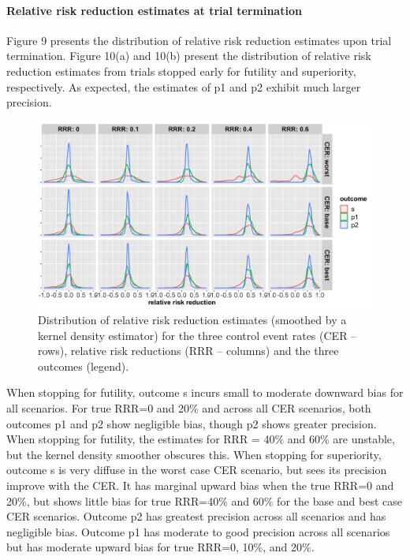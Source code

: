 \documentclass[]{article}
\let\oldparagraph\paragraph
\renewcommand{\paragraph}[1]{\oldparagraph{#1}\mbox{}}
\begin{document}
\clearpage

\hypertarget{relative-risk-reduction-estimates-at-trial-termination}{%
\paragraph{Relative risk reduction estimates at trial
termination}\label{relative-risk-reduction-estimates-at-trial-termination}}

Figure 9 presents the distribution of relative risk reduction estimates
upon trial termination. Figure 10(a) and 10(b) present the distribution
of relative risk reduction estimates from trials stopped early for
futility and superiority, respectively. As expected, the estimates of p1
and p2 exhibit much larger precision.

\begin{figure}
  \caption{Distribution of relative risk reduction estimates (smoothed by a kernel density estimator) for the three
  control event rates (CER – rows), relative risk reductions (RRR – columns) and the three outcomes (legend).}
  \includegraphics{../p1_plots/batch_size_nb_1000/RRRhat_p1.png}
\end{figure}

When stopping for futility, outcome s incurs small to moderate downward
bias for all scenarios. For true RRR=0 and 20\% and across all CER
scenarios, both outcomes p1 and p2 show negligible bias, though p2 shows
greater precision. When stopping for futility, the estimates for RRR =
40\% and 60\% are unstable, but the kernel density smoother obscures
this. When stopping for superiority, outcome s is very diffuse in the
worst case CER scenario, but sees its precision improve with the CER. It
has marginal upward bias when the true RRR=0 and 20\%, but shows little
bias for true RRR=40\% and 60\% for the base and best case CER
scenarios. Outcome p2 has greatest precision across all scenarios and
has negligible bias. Outcome p1 has moderate to good precision across
all scenarios but has moderate upward bias for true RRR=0, 10\%, and
20\%.
\end{document}
